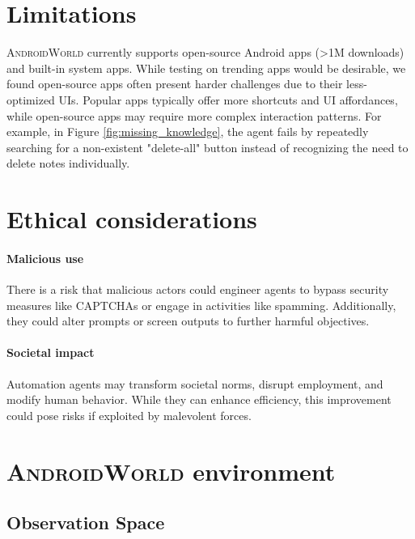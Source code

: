 \documentclass{article}
\newcommand{\system}{\textsc{AndroidWorld}\xspace}
\begin{document}
\begin{appendices}

\section{Limitations}
\label{sec:limitations}
\system currently supports open-source Android apps (\textgreater1M downloads) and built-in system apps. While testing on trending apps would be desirable, we found open-source apps often present harder challenges due to their less-optimized UIs. Popular apps typically offer more shortcuts and UI affordances, while open-source apps may require more complex interaction patterns. For example, in Figure \ref{fig:missing_knowledge}, the agent fails by repeatedly searching for a non-existent "delete-all" button instead of recognizing the need to delete notes individually.

\section{Ethical considerations}
\label{sec:ethical_considerations}

\paragraph{Malicious use} There is a risk that malicious actors could engineer agents to bypass security measures like CAPTCHAs or engage in activities like spamming. Additionally, they could alter prompts or screen outputs to further harmful objectives.

\paragraph{Societal impact} Automation agents may transform societal norms, disrupt employment, and modify human behavior. While they can enhance efficiency, this improvement could pose risks if exploited by malevolent forces.

\section{\system environment}
\label{sec:appendix_environment}

\subsection{Observation Space}
\label{subsec:observation}


\end{appendices}
\end{document}
